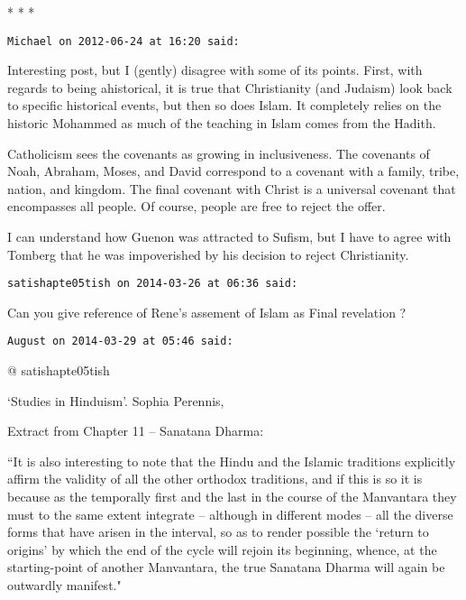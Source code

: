 
\begin{center}* * *\end{center}

\begin{footnotesize}\begin{sffamily}



\texttt{Michael on 2012-06-24 at 16:20 said: }

Interesting post, but I (gently) disagree with some of its points. First, with regards to being ahistorical, it is true that Christianity (and Judaism) look back to specific historical events, but then so does Islam. It completely relies on the historic Mohammed as much of the teaching in Islam comes from the Hadith.

Catholicism sees the covenants as growing in inclusiveness. The covenants of Noah, Abraham, Moses, and David correspond to a covenant with a family, tribe, nation, and kingdom. The final covenant with Christ is a universal covenant that encompasses all people. Of course, people are free to reject the offer.

I can understand how Guenon was attracted to Sufism, but I have to agree with Tomberg that he was impoverished by his decision to reject Christianity.


\hfill

\texttt{satishapte05tish on 2014-03-26 at 06:36 said: }

Can you give reference of Rene's assement of Islam as Final revelation ?


\hfill

\texttt{August on 2014-03-29 at 05:46 said: }

@ satishapte05tish

`Studies in Hinduism'. Sophia Perennis,

Extract from Chapter 11 – Sanatana Dharma:

``It is also interesting to note that the Hindu and the Islamic traditions explicitly affirm the validity of all the other orthodox traditions, and if this is so it is because as the temporally first and the last in the course of the Manvantara they must to the same extent integrate – although in different modes – all the diverse forms that have arisen in the interval, so as to render possible the `return to origins' by which the end of the cycle will rejoin its beginning, whence, at the starting-point of another Manvantara, the true Sanatana Dharma will again be outwardly manifest."



\end{sffamily}
\end{footnotesize}
